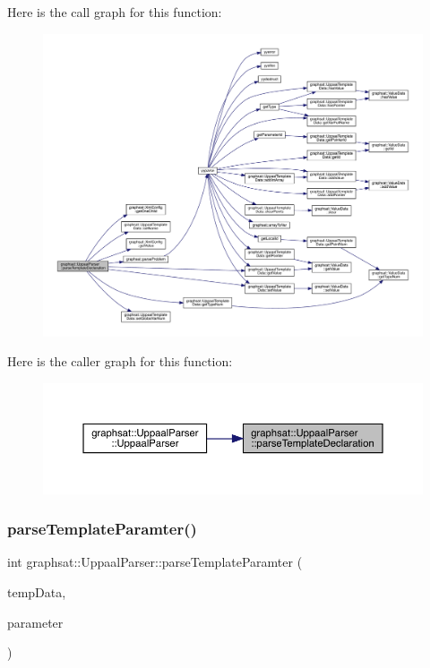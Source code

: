 Here is the call graph for this function\+:
\nopagebreak
\begin{figure}[H]
\begin{center}
\leavevmode
\includegraphics[width=350pt]{classgraphsat_1_1_uppaal_parser_a458fdbf8c38c19215b191bc6a992d38e_cgraph}
\end{center}
\end{figure}
Here is the caller graph for this function\+:
\nopagebreak
\begin{figure}[H]
\begin{center}
\leavevmode
\includegraphics[width=350pt]{classgraphsat_1_1_uppaal_parser_a458fdbf8c38c19215b191bc6a992d38e_icgraph}
\end{center}
\end{figure}
\mbox{\label{classgraphsat_1_1_uppaal_parser_ad22c12325a60e719980d25c6368a7b7c}} 
\subsubsection{\texorpdfstring{parseTemplateParamter()}{parseTemplateParamter()}}
{\footnotesize\ttfamily int graphsat\+::\+Uppaal\+Parser\+::parse\+Template\+Paramter (\begin{DoxyParamCaption}\item[{\mbox{\hyperlink{classgraphsat_1_1_uppaal_template_data}{Uppaal\+Template\+Data}} \&}]{temp\+Data,  }\item[{\mbox{\hyperlink{namespacegraphsat_a94de7ec8ce4b5d6bc48bdc19e58b2d76}{X\+M\+L\+\_\+P}}}]{parameter }\end{DoxyParamCaption})\hspace{0.3cm}{\ttfamily [private]}}

